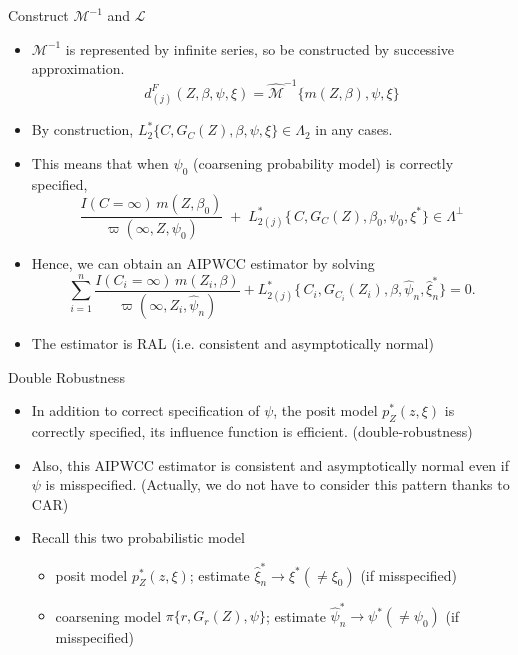 \documentclass[xcolor=dvipsnames,aspectratio=169]{beamer}
\newcommand{\1}{\mathbbm{1}}
\begin{document}
\begin{frame}{Construct $\mathcal{M}^{-1}$ and $\mathcal{L}$}
  \begin{itemize}
    \item $\mathcal{M}^{-1}$ is represented by infinite series, so be constructed by successive approximation.
    \[
    d^F_{(j)}(Z,\beta,\psi,\xi) = \hat{\mathcal{M}}^{-1}\{m(Z,\beta),\psi,\xi\}
    \]
    \item By construction, $L^{\ast}_2\{C,G_C(Z),\beta,\psi,\xi\}\in \Lambda_2$ in any cases.
    \item This means that when $\psi_0$ (coarsening probability model) is correctly specified, 
    \[
    \frac{I(C=\infty)\,m(Z,\beta_{0})}{\varpi(\infty,Z,\psi_{0})}
\;+\;
L^{\ast}_{2(j)}\{\,C,G_{C}(Z),\beta_{0},\psi_{0},\xi^{\ast}\}\in \Lambda^{\perp}
    \]
    \item Hence, we can obtain an AIPWCC estimator by solving
    \[
    \sum_{i=1}^{n}
  \frac{I(C_{i}=\infty)\,m(Z_{i},\beta)}
       {\varpi(\infty,Z_{i},\hat{\psi}_{n})}
  + L^{\ast}_{2(j)}\{\,C_{i},G_{C_{i}}(Z_{i}),\beta,\hat{\psi}_{n},\hat{\xi}^{\ast}_{n}\}
= 0.
    \]
    \item The estimator is RAL (i.e. consistent and asymptotically normal)
  \end{itemize}
\end{frame}

\begin{frame}{Double Robustness}
  \begin{itemize}
    \item In addition to correct specification of $\psi$, the posit model $p_Z^*(z,\xi)$ is correctly specified, its influence function is \alert{efficient}. (double-robustness)
    \item Also, this AIPWCC estimator is consistent and asymptotically normal even if $\psi$ is misspecified. (Actually, we do not have to consider this pattern \alert{thanks to CAR})
    \item Recall this two probabilistic model
    \begin{itemize}
      \item posit model $p_Z^*(z,\xi)$; estimate $\hat{\xi}_n^* \rightarrow \xi^*(\neq \xi_0)$ (if misspecified)
      \item coarsening model $\pi\{r, G_r(Z),\psi\}$; estimate $\hat{\psi}_n^*\rightarrow \psi^*(\neq \psi_0)$ (if misspecified)
    \end{itemize} 
  \end{itemize}
\end{frame}
\end{document}
